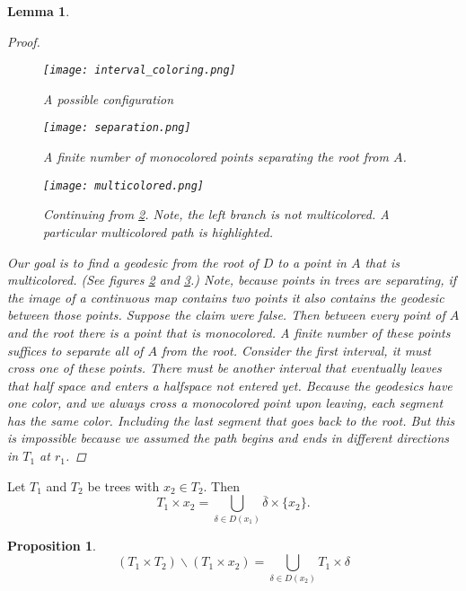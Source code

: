 \documentclass[12pt,parskip=full]{report}
\theoremstyle{plain}
\newtheorem{lem}[thm]{Lemma}
\newtheorem{prop}[thm]{Proposition}
\theoremstyle{definition}
\begin{document}
\begin{lem}
\begin{proof}
\begin{figure}[!h]
    \centering
    \texttt{[image: interval\_coloring.png]}
    \caption{A possible configuration}
    \label{fig:possibleconfig}
\end{figure}
\begin{figure}[!h]
    \centering
    \texttt{[image: separation.png]}
    \caption{A finite number of monocolored points separating the root from $A$.}
    \label{fig:separation}
\end{figure}
\begin{figure}[!h]
    \centering
    \texttt{[image: multicolored.png]}
    \caption{Continuing from \ref{fig:separation}.  Note, the left branch is not multicolored. A particular multicolored path is highlighted.}
    \label{fig:multicolored}
\end{figure}


        Our goal is to find a geodesic from the root of \(D\) to a point in \(A\) that is multicolored. (See figures \ref{fig:separation} and \ref{fig:multicolored}.) Note, because points in trees are separating, if the image of a continuous map contains two points it also contains the geodesic between those points. Suppose the claim were false. Then between every point of \(A\) and the root there is a point that is monocolored. A finite number of these points suffices to separate all of \(A\) from the root. Consider the first interval, it must cross one of these points. There must be another interval that eventually leaves that half space and enters a halfspace not entered yet. Because the geodesics have one color, and we always cross a monocolored point upon leaving, each segment has the same color. Including the last segment that goes back to the root. But this is impossible because we assumed the path begins and ends in different directions in \(T_{1}\) at \(r_{1}\).

    \end{proof}
\end{lem}

\begin{pro}
\label{prop:directionunion}
Let $T_1$ and $T_2$ be trees with $x_2\in T_2$. Then $$T_1\times x_2 = \bigcup_{\delta \in D(x_1)} \overline{\delta}\times \{x_2\}.$$
\end{pro}


\begin{prop}
\label{prop:sliceunion}
\[ \left(T_1 \times T_2\right) \smallsetminus \left(T_1\times x_2\right) = \bigcup_{\delta\in D(x_2)} T_1\times \delta\]
\end{prop}
\end{document}
